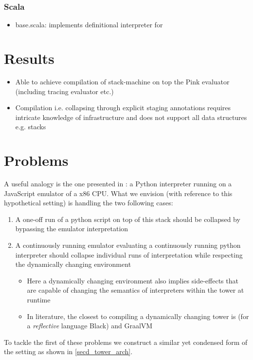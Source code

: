 \documentclass{article}
\begin{document}
\subsubsection{Scala}
\begin{itemize}
	\item base.scala: implements definitional interpreter for \mslang
\end{itemize}

\section{Results}
\begin{itemize}
	\item Able to achieve compilation of stack-machine on top the Pink evaluator (including tracing evaluator etc.)
	\item Compilation i.e. collapsing through explicit staging annotations requires intricate knowledge of infrastructure and does not support all data structures e.g. stacks
\end{itemize}

\section{Problems}
A useful analogy is the one presented in \cite{amin2017collapsing}: a Python interpreter running on a JavaScript emulator of a x86 CPU. What we envision (with reference to this hypothetical setting) is handling the two following cases:
\begin{enumerate}
	\item A one-off run of a python script on top of this stack should be collapsed by bypassing the emulator interpretation
	\item A continuously running emulator evaluating a continuously running python interpreter should collapse individual runs of interpretation while respecting the dynamically changing environment
	\begin{itemize}
		\item Here a dynamically changing environment also implies side-effects that are capable of changing the semantics of interpreters within the tower at runtime
		\item In literature, the closest to compiling a dynamically changing tower is \cite{asai1997partial, amin2017collapsing} (for a \textit{reflective} language Black) and GraalVM \cite{wurthinger2013one}
	\end{itemize}
\end{enumerate}
To tackle the first of these problems we construct a similar yet condensed form of the setting as shown in \ref{secd_tower_arch}.
\end{document}
